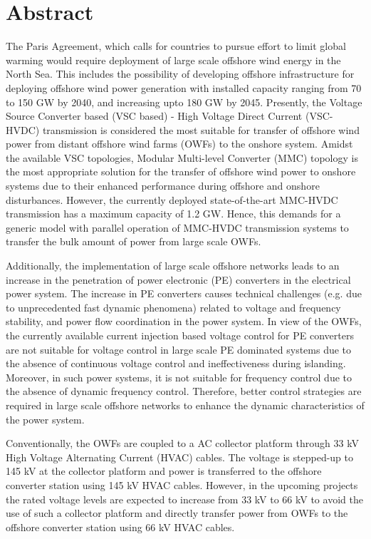 \chapter*{Abstract}



The Paris Agreement, which calls for countries to pursue effort to limit global warming would require deployment of large scale offshore wind energy in the North Sea. This includes the possibility of developing offshore infrastructure for deploying offshore wind power generation with installed capacity ranging from 70 to 150 GW by 2040, and increasing upto 180 GW by 2045. Presently, the Voltage Source Converter based (VSC based) - High Voltage Direct Current (VSC-HVDC) transmission is considered the most suitable for transfer of offshore wind power from distant offshore wind farms (OWFs) to the onshore system. Amidst the available VSC topologies, Modular Multi-level Converter (MMC) topology is the most appropriate  solution for the transfer of offshore wind power to onshore systems due to their enhanced performance during offshore and onshore disturbances. However, the currently deployed state-of-the-art MMC-HVDC transmission has a maximum capacity of 1.2 GW. Hence, this demands for a generic model with parallel operation of MMC-HVDC transmission systems to transfer the bulk amount of power from large scale OWFs. 

Additionally, the implementation of large scale offshore networks leads to an increase in the penetration of power electronic (PE) converters in the electrical power system. The increase in PE converters causes technical challenges (e.g. due to unprecedented fast dynamic phenomena) related to voltage and frequency stability, and power flow coordination in the power system. In view of the OWFs, the currently available current injection based voltage control for PE converters are not suitable for voltage control in large scale PE dominated systems due to the absence of continuous voltage control and ineffectiveness during islanding. Moreover, in such power systems, it is not suitable for frequency control due to the absence of dynamic frequency control. Therefore, better control strategies are required in large scale offshore networks to enhance the dynamic characteristics of the power system. 

Conventionally, the OWFs are coupled to a AC collector platform through 33 kV High Voltage Alternating Current (HVAC) cables. The voltage is stepped-up to 145 kV at the collector platform and power is transferred to the offshore converter station using 145 kV HVAC cables. However, in the upcoming projects the rated voltage levels are expected to increase from 33 kV to 66 kV to avoid the use of such a collector platform and directly transfer power from OWFs to the offshore converter station using 66 kV HVAC cables.   

